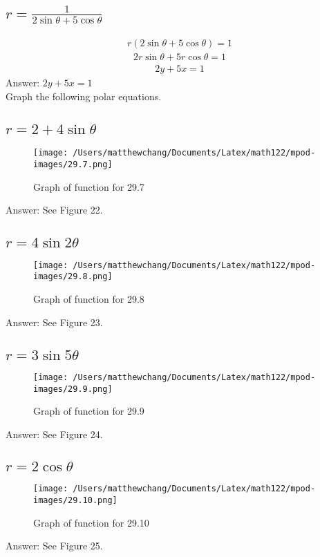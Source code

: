 \documentclass{article}
\begin{document}
\subsection{$r = \frac{1}{2 \sin{\theta} + 5 \cos{\theta}}$}
\begin{align*}
	r(2\sin{\theta} + 5\cos{\theta}) = 1
\end{align*}
\begin{align*}
	2r\sin{\theta} + 5r\cos{\theta} = 1
\end{align*}
\begin{align*}
	2y + 5x = 1
\end{align*}
Answer: $2y + 5x = 1$
\\[10pt]
Graph the following polar equations.

\subsection{$r = 2 + 4\sin{\theta}$}
\begin{figure}
	\centering
	\texttt{[image: /Users/matthewchang/Documents/Latex/math122/mpod-images/29.7.png]}
	\caption{Graph of function for 29.7}
\end{figure}
Answer: See Figure 22. 

\subsection{$r = 4 \sin{2 \theta}$}
\begin{figure}
	\centering
	\texttt{[image: /Users/matthewchang/Documents/Latex/math122/mpod-images/29.8.png]}
	\caption{Graph of function for 29.8}
\end{figure}
Answer: See Figure 23. 

\subsection{$r = 3 \sin{5 \theta}$}
\begin{figure}
	\centering
	\texttt{[image: /Users/matthewchang/Documents/Latex/math122/mpod-images/29.9.png]}
	\caption{Graph of function for 29.9}
\end{figure}
Answer: See Figure 24. 

\subsection{$r = 2 \cos{\theta}$}
\begin{figure}
	\centering
	\texttt{[image: /Users/matthewchang/Documents/Latex/math122/mpod-images/29.10.png]}
	\caption{Graph of function for 29.10}
\end{figure}
Answer: See Figure 25. 
\end{document}
